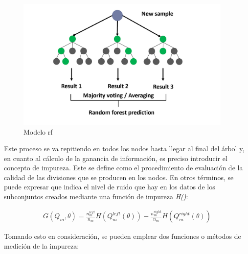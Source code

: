 \vspace{3mm}

\begin{figure}[h!]
    \centering
    \includegraphics[width=0.95\textwidth]{img/teoria/rf.png}
    \caption{Modelo \acrshort{rf} \cite{rfmedium}}
    \label{fig:rf}
\end{figure}

\vspace{3mm}

Este proceso se va repitiendo en todos los nodos hasta llegar al final del árbol y, en cuanto al cálculo de la ganancia de información, es preciso introducir el concepto de impureza. Este se define como el procedimiento de evaluación de la calidad de las divisiones que se producen en los nodos. En otros términos, se puede expresar que indica el nivel de ruido que hay en los datos de los subconjuntos creados mediante una función de impureza \textit{H()}:

\vspace{3mm}

\begin{equation}
    \begin{aligned}
        G(Q_m, \theta) = \frac{n_m^{left}}{n_m} H(Q_m^{left}(\theta)) + \frac{n_m^{right}}{n_m} H(Q_m^{right}(\theta))
    \end{aligned}
\end{equation}

\vspace{3mm}

Tomando esto en consideración, se pueden emplear dos funciones o métodos de medición de la impureza:~\cite{rfmedium2} \cite{scikitrf}

